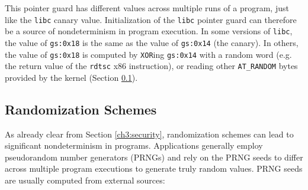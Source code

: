 This pointer guard has different values
across multiple runs of a program, just like the \texttt{libc} canary
value. Initialization of the \texttt{libc} pointer guard can 
therefore be a source of nondeterminism in program execution. 
In some versions of \texttt{libc}, the value of \texttt{gs:0x18} is the same
as the value of \texttt{gs:0x14} (the canary). In others,
the value of \texttt{gs:0x18} is computed by \texttt{XOR}ing \texttt{gs:0x14} with 
a random word (e.g. the return value of the \texttt{rdtsc} x86 instruction),
or reading other \texttt{AT\_RANDOM} bytes provided by the kernel
 (Section \ref{ch3:rand}).

\subsection{Randomization Schemes} \label{ch3:rand}
As already clear from Section \ref{ch3:security}, 
randomization schemes can lead to significant nondeterminism 
in programs. Applications generally employ pseudorandom number generators (PRNGs)
and rely on the PRNG seeds to differ across multiple program executions 
to generate truly random values. PRNG seeds are usually
computed from external sources:

